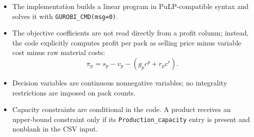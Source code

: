 \begin{itemize}
    \item The implementation builds a linear program in PuLP-compatible syntax and solves it with \texttt{GUROBI\_CMD(msg=0)}.
    \item The objective coefficients are not read directly from a profit column; instead, the code explicitly computes profit per pack as selling price minus variable cost minus raw material costs:
    \[
    \pi_p = s_p - v_p - (g_p c^g + r_p c^r).
    \]
    \item Decision variables are continuous nonnegative variables; no integrality restrictions are imposed on pack counts.
    \item Capacity constraints are conditional in the code. A product receives an upper-bound constraint only if its \texttt{Production\_capacity} entry is present and nonblank in the CSV input.
\end{itemize}
